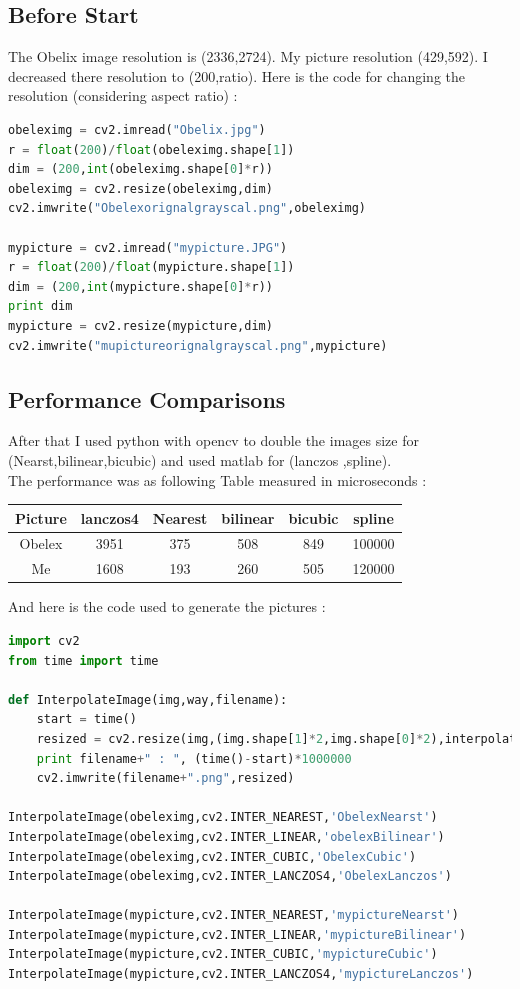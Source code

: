 \documentclass{article}
\begin{document}
\subsection*{Before Start}
The Obelix image resolution is (2336,2724).
My picture resolution (429,592).
I decreased there resolution to (200,ratio). Here is the code for changing the resolution (considering aspect ratio) :
\begin{lstlisting}[language=Python]
obeleximg = cv2.imread("Obelix.jpg")
r = float(200)/float(obeleximg.shape[1])
dim = (200,int(obeleximg.shape[0]*r))
obeleximg = cv2.resize(obeleximg,dim)
cv2.imwrite("Obelexorignalgrayscal.png",obeleximg)

mypicture = cv2.imread("mypicture.JPG")
r = float(200)/float(mypicture.shape[1])
dim = (200,int(mypicture.shape[0]*r))
print dim
mypicture = cv2.resize(mypicture,dim)
cv2.imwrite("mupictureorignalgrayscal.png",mypicture)
\end{lstlisting}
\subsection*{Performance Comparisons}
After that I used python with opencv to double the images size for (Nearst,bilinear,bicubic) and used matlab for (lanczos ,spline).\\
The performance was as following Table measured in microseconds  : \\
\begin{tabular}{|c|c|c|c|c|c|}
\hline
Picture&lanczos4&Nearest&bilinear&bicubic&spline\\
\hline
Obelex&3951&375&508&849&100000\\
\hline
Me&1608&193&260&505&120000\\
\hline
\end{tabular}
And here is the code used to generate the pictures : 
\begin{lstlisting}[language=Python]
import cv2
from time import time

def InterpolateImage(img,way,filename):
	start = time()
	resized = cv2.resize(img,(img.shape[1]*2,img.shape[0]*2),interpolation=way)
	print filename+" : ", (time()-start)*1000000
	cv2.imwrite(filename+".png",resized)	 

InterpolateImage(obeleximg,cv2.INTER_NEAREST,'ObelexNearst')
InterpolateImage(obeleximg,cv2.INTER_LINEAR,'obelexBilinear')
InterpolateImage(obeleximg,cv2.INTER_CUBIC,'ObelexCubic')
InterpolateImage(obeleximg,cv2.INTER_LANCZOS4,'ObelexLanczos')

InterpolateImage(mypicture,cv2.INTER_NEAREST,'mypictureNearst')
InterpolateImage(mypicture,cv2.INTER_LINEAR,'mypictureBilinear')
InterpolateImage(mypicture,cv2.INTER_CUBIC,'mypictureCubic')
InterpolateImage(mypicture,cv2.INTER_LANCZOS4,'mypictureLanczos')
\end{lstlisting}
\newpage
\end{document}
